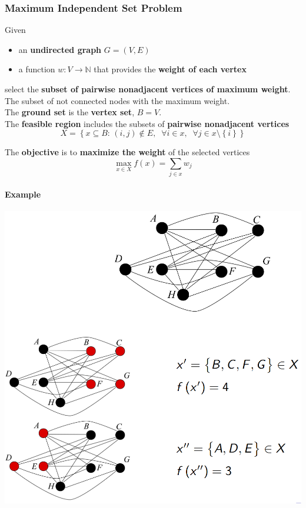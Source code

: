 \newpage

\subsubsection{Maximum Independent Set Problem}
Given
\begin{itemize}
	\item an \textbf{undirected graph} $G = (V , E )$
	\item a function $w : V \rightarrow \mathbb{N}$ that provides the \textbf{weight of each vertex}
\end{itemize}
select the \textbf{subset of pairwise nonadjacent vertices of maximum weight}.\\
The subset of not connected nodes with the maximum weight.\\

The \textbf{ground set} is the \textbf{vertex set}, $B = V$.\\

The \textbf{feasible region} includes the subsets of \textbf{pairwise nonadjacent vertices}
$$ X = \left\{x \subseteq B : \, (i,j) \notin E, \;\; \forall i \in x, \;\; \forall j \in x \setminus \left\{i\right\}\right\}$$

The \textbf{objective} is to \textbf{maximize the weight} of the selected vertices
$$ \max_{x \in X} f(x) = \sum_{j \in x} w_j $$

\newpage

\paragraph{Example}
\begin{center}
	\includegraphics[width=\columnwidth]{img/MISP1}
\end{center}

